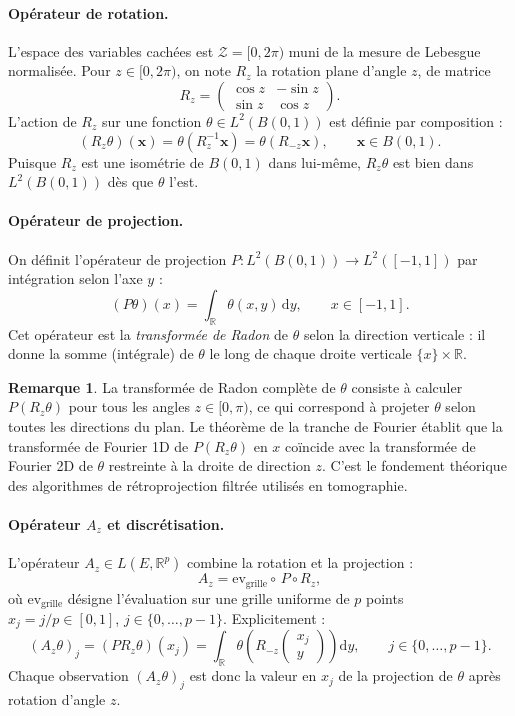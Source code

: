 \documentclass[12pt, a4paper]{article}
\theoremstyle{definition}
\newtheorem{remark}[theorem]{Remarque}
\newcommand{\R}{\mathbb{R}}
\newcommand{\Zcal}{\mathcal{Z}}
\begin{document}
\paragraph{Opérateur de rotation.}
L'espace des variables cachées est $\Zcal = [0, 2\pi)$ muni de la mesure de
Lebesgue normalisée. Pour $z \in [0, 2\pi)$, on note $R_z$ la rotation plane
d'angle $z$, de matrice
\[
    R_z = \begin{pmatrix} \cos z & -\sin z \\ \sin z & \cos z \end{pmatrix}.
\]
L'action de $R_z$ sur une fonction $\theta \in L^2(B(0,1))$ est définie par
composition :
\[
    (R_z\theta)(\mathbf{x}) = \theta(R_z^{-1}\mathbf{x}) = \theta(R_{-z}\mathbf{x}),
    \qquad \mathbf{x} \in B(0,1).
\]
Puisque $R_z$ est une isométrie de $B(0,1)$ dans lui-même, $R_z\theta$ est bien
dans $L^2(B(0,1))$ dès que $\theta$ l'est.

\paragraph{Opérateur de projection.}
On définit l'opérateur de projection $P : L^2(B(0,1)) \to L^2([-1,1])$ par
intégration selon l'axe $y$ :
\[
    (P\theta)(x) = \int_{\R} \theta(x, y)\,\mathrm{d}y, \qquad x \in [-1, 1].
\]
Cet opérateur est la \textit{transformée de Radon} de $\theta$ selon la direction
verticale : il donne la somme (intégrale) de $\theta$ le long de chaque droite
verticale $\{x\} \times \R$.

\begin{remark}
    La transformée de Radon complète de $\theta$ consiste à calculer $P(R_z\theta)$
    pour tous les angles $z \in [0, \pi)$, ce qui correspond à projeter $\theta$ selon
    toutes les directions du plan. Le théorème de la tranche de Fourier établit que la
    transformée de Fourier 1D de $P(R_z\theta)$ en $x$ coïncide avec la transformée
    de Fourier 2D de $\theta$ restreinte à la droite de direction $z$. C'est le
    fondement théorique des algorithmes de rétroprojection filtrée utilisés en
    tomographie.
\end{remark}

\paragraph{Opérateur $A_z$ et discrétisation.}
L'opérateur $A_z \in L(E, \R^p)$ combine la rotation et la projection :
\[
    A_z = \mathrm{ev}_{\text{grille}} \circ\, P \circ R_z,
\]
où $\mathrm{ev}_{\text{grille}}$ désigne l'évaluation sur une grille uniforme
de $p$ points $x_j = j/p \in [0, 1]$, $j \in \{0, \ldots, p-1\}$. Explicitement :
\[
    (A_z\theta)_j = (P R_z\theta)(x_j) = \int_{\R} \theta\!\left(R_{-z}
    \begin{pmatrix} x_j \\ y \end{pmatrix}\right)\mathrm{d}y,
    \qquad j \in \{0, \ldots, p-1\}.
\]
Chaque observation $(A_z\theta)_j$ est donc la valeur en $x_j$ de la projection
de $\theta$ après rotation d'angle $z$.
\end{document}
